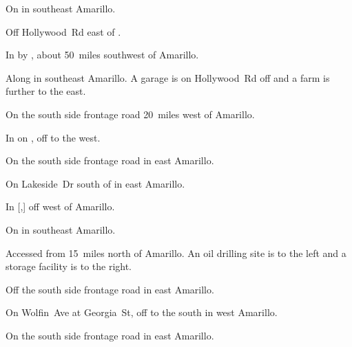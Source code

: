 
\begin{LocationList}

\Location{\GarageHQ \Garage}
On  in southeast Amarillo.

Off  Hollywood~Rd east of .

In  by , about 50~miles southwest of Amarillo.

Along  in southeast Amarillo.
A garage is on Hollywood~Rd off  and a farm is further to the east.

On the south side  frontage road 20~miles west of Amarillo.

In  on , off  to the west.

On the south side  frontage road in east Amarillo.

\Location{\TruckStop \Gas \Rest \Service \Weigh}
On  Lakeside~Dr south of  in east Amarillo.

In [,] off  west of Amarillo.

On  in southeast Amarillo.

Accessed from  15~miles north of Amarillo.
An oil drilling site is to the left and a storage facility is to the right.

Off the south side  frontage road in east Amarillo.

On Wolfin~Ave at Georgia~St, off  to the south in west Amarillo.

On the south side  frontage road in east Amarillo.

\end{LocationList}
